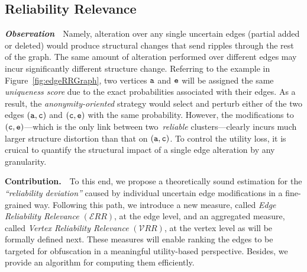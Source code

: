 \subsection{Reliability Relevance}

\textbf{\emph{Observation}}~~Namely, alteration over any single uncertain edges (partial added or deleted) would produce structural changes that send ripples through the rest of the graph. 
The same amount of alteration performed over different edges may incur significantly different structure change. 
Referring to the example in Figure~\ref{fig:edgeRRGraph}, two vertices $\tt{a}$ and $\tt{e}$ will be assigned the same {\em uniqueness score} due to the exact probabilities associated with their edges. 
As a result, the {\em anonymity-oriented} strategy would select and perturb either of the two edges $(\tt{a},\tt{c})$ and $(\tt{c},\tt{e})$ with the same probability. However, the modifications to $(\tt{c},\tt{e})$---which is the only link between two~\emph{reliable} clusters---clearly incurs much larger structure distortion than that on $(\tt{a},\tt{c})$. To control the utility loss, it is cruical to quantify the structural impact of a single edge alteration by any granularity. 



\textbf{Contribution.}~~To this end, we propose a theoretically sound estimation for the {\em ``reliability deviation''} caused by individual uncertain edge modifications in a fine-grained way. 
Following this path, we introduce a new measure, called {\em Edge Reliability Relevance $(\mathcal{E}RR)$}, at the edge level, and an aggregated measure, called {\em Vertex Reliability Relevance} $(\mathcal{V}RR)$, at the vertex level as will be formally defined next. These measures will enable ranking the edges to be targeted for obfuscation in a meaningful utility-based perspective. Besides, we provide an algorithm for computing them efficiently. 


